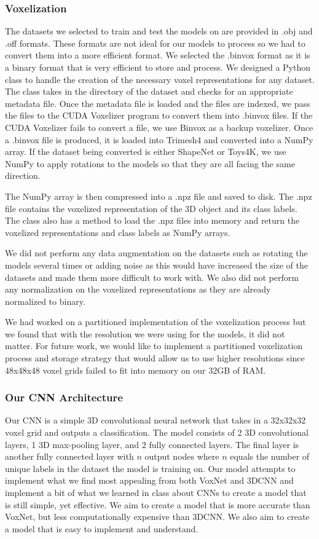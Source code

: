 \documentclass[conference]{IEEEtran}
\begin{document}
\subsubsection{Voxelization}
The datasets we selected to train and test the models on are provided in .obj and .off formats. These formats are not ideal for our models to process so we had to convert them into a more efficient format. We selected the .binvox format as it is a binary format that is very efficient to store and process. We designed a Python class to handle the creation of the necessary voxel representations for any dataset. The class takes in the directory of the dataset and checks for an appropriate metadata file. Once the metadata file is loaded and the files are indexed, we pass the files to the CUDA Voxelizer program to convert them into .binvox files. If the CUDA Voxelizer fails to convert a file, we use Binvox as a backup voxelizer. Once a .binvox file is produced, it is loaded into Trimesh4 and converted into a NumPy array. If the dataset being converted is either ShapeNet or Toys4K, we use NumPy to apply rotations to the models so that they are all facing the same direction.

The NumPy array is then compressed into a .npz file and saved to disk. The .npz file contains the voxelized representation of the 3D object and its class labels. The class also has a method to load the .npz files into memory and return the voxelized representations and class labels as NumPy arrays.

We did not perform any data augmentation on the datasets such as rotating the models several times or adding noise \cite{7353481} \cite{gwak20153d} \cite{shaoxu20163d} as this would have increased the size of the datasets and made them more difficult to work with. We also did not perform any normalization on the voxelized representations as they are already normalized to binary. 

We had worked on a partitioned implementation of the voxelization process but we found that with the resolution we were using for the models, it did not matter. For future work, we would like to implement a partitioned voxelization process and storage strategy that would allow us to use higher resolutions since 48x48x48 voxel grids failed to fit into memory on our 32GB of RAM.

\subsubsection{Our CNN Architecture}
Our CNN is a simple 3D convolutional neural network that takes in a 32x32x32 voxel grid and outputs a classification. The model consists of 2 3D convolutional layers, 1 3D max-pooling layer, and 2 fully connected layers. The final layer is another fully connected layer with $n$ output nodes where $n$ equals the number of unique labels in the dataset the model is training on. Our model attempts to implement what we find most appealing from both VoxNet and 3DCNN and implement a bit of what we learned in class about CNNs to create a model that is still simple, yet effective. We aim to create a model that is more accurate than VoxNet, but less computationally expensive than 3DCNN. We also aim to create a model that is easy to implement and understand.
\end{document}
